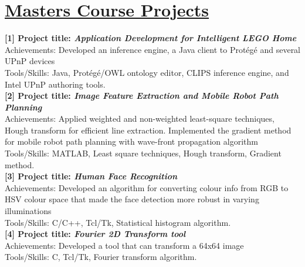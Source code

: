 \documentclass[notopicbreak,contbibnum,plain]{simplecv}
\begin{document}
\section{\textbf{\underline{Masters Course Projects}}}
\vspace*{-0.3cm}
\textbf{[1] Project title: \textit{Application Development for Intelligent LEGO Home}}\\
Achievements: Developed an inference engine, a Java client to Prot\'{e}g\'{e} and several UPnP devices\\
Tools/Skills: Java, Prot\'{e}g\'{e}/OWL ontology editor, CLIPS inference engine, and Intel UPnP authoring tools.\\
\textbf{[2] Project title: \textit{Image Feature Extraction and Mobile Robot Path Planning}}\\
Achievements: Applied weighted and non-weighted least-square techniques, Hough transform for efficient line extraction. Implemented the gradient method for mobile robot path planning with wave-front propagation algorithm\\
Tools/Skills: MATLAB, Least square techniques, Hough transform, Gradient method.\\
\textbf{[3] Project title: \textit{Human Face Recognition}}\\
Achievements: Developed an algorithm for converting colour info from RGB to HSV colour space that made the face detection more robust in varying illuminations\\
Tools/Skills: C/C++, Tcl/Tk, Statistical histogram algorithm.\\
\textbf{[4] Project title: \textit{Fourier 2D Transform tool}}\\
Achievements: Developed a tool that can transform a 64x64 image\\
Tools/Skills: C, Tcl/Tk, Fourier transform algorithm.
\vspace*{-0.3cm}
\end{document}
